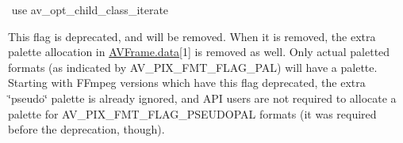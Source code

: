 \begin{DoxyRefList}
$$%
use av\+\_\+opt\+\_\+child\+\_\+class\+\_\+iterate  
\item[Member \mbox{\hyperlink{pixdesc_8h_ac6da04f0acd85424801bedcdd949c97d}{A\+V\+\_\+\+P\+I\+X\+\_\+\+F\+M\+T\+\_\+\+F\+L\+A\+G\+\_\+\+P\+S\+E\+U\+D\+O\+P\+AL}} ]\label{deprecated__deprecated000089}%
%
This flag is deprecated, and will be removed. When it is removed, the extra palette allocation in \mbox{\hyperlink{struct_a_v_frame_a1d0f65014a8d1bf78cec8cbed2304992}{A\+V\+Frame.\+data}}\mbox{[}1\mbox{]} is removed as well. Only actual paletted formats (as indicated by A\+V\+\_\+\+P\+I\+X\+\_\+\+F\+M\+T\+\_\+\+F\+L\+A\+G\+\_\+\+P\+AL) will have a palette. Starting with F\+Fmpeg versions which have this flag deprecated, the extra \char`\"{}pseudo\char`\"{} palette is already ignored, and A\+PI users are not required to allocate a palette for A\+V\+\_\+\+P\+I\+X\+\_\+\+F\+M\+T\+\_\+\+F\+L\+A\+G\+\_\+\+P\+S\+E\+U\+D\+O\+P\+AL formats (it was required before the deprecation, though). 
\end{DoxyRefList}